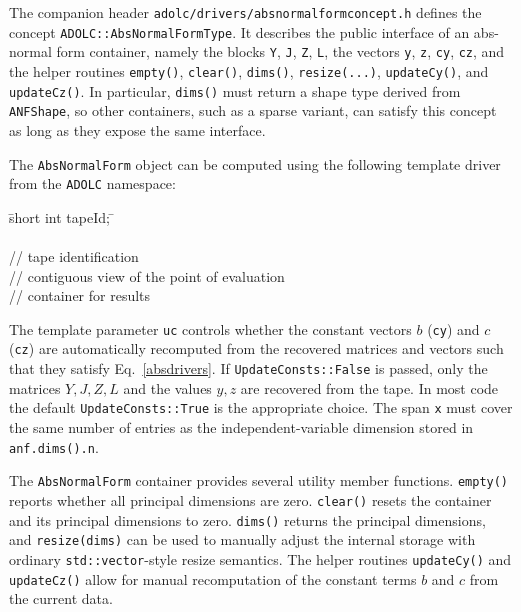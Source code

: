 The companion header \texttt{adolc/drivers/absnormalformconcept.h} defines the
concept \texttt{ADOLC::AbsNormalFormType}. It describes the public interface of
an abs-normal form container, namely the blocks \texttt{Y}, \texttt{J},
\texttt{Z}, \texttt{L}, the vectors \texttt{y}, \texttt{z}, \texttt{cy},
\texttt{cz}, and the helper routines \texttt{empty()}, \texttt{clear()},
\texttt{dims()}, \texttt{resize(...)}, \texttt{updateCy()}, and
\texttt{updateCz()}. In particular, \texttt{dims()} must return a shape type
derived from \texttt{ANFShape}, so other containers, such as a sparse variant,
can satisfy this concept as long as they expose the same interface.

The \texttt{AbsNormalForm} object can be computed using the following 
template driver from the \texttt{ADOLC} namespace:

\begin{tabbing}
\hspace{0.5in}\={\sf short int tapeId;} \hspace{1.8in}\= \kill    %
\\
\\
         \> // tape identification \\
 \> // contiguous view of the point of evaluation \\
   \> // container for results
\end{tabbing}

The template parameter \texttt{uc} controls whether the constant vectors 
$b$ (\texttt{cy}) and $c$ (\texttt{cz}) are automatically recomputed 
from the recovered matrices and vectors such that they satisfy 
Eq.~\eqref{absdrivers}. If \texttt{UpdateConsts::False} is passed, 
only the matrices $Y, J, Z, L$ and the values $y, z$ are recovered 
from the tape. In most code the default
\texttt{UpdateConsts::True} is the appropriate choice. The span \texttt{x}
must cover the same number of entries as the independent-variable dimension
stored in \texttt{anf.dims().n}.

The \texttt{AbsNormalForm} container provides several utility member
functions. \texttt{empty()} reports whether all principal dimensions are zero.
\texttt{clear()} resets the container and its principal dimensions to zero.
\texttt{dims()} returns the principal dimensions, and \texttt{resize(dims)} can
be used to manually adjust the internal storage with ordinary
\texttt{std::vector}-style resize semantics. The helper routines
\texttt{updateCy()} and \texttt{updateCz()} allow for manual recomputation
of the constant terms $b$ and $c$ from the current data.

